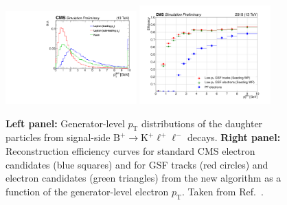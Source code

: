 \documentclass{webofc}
\newcommand{\ellell}{\ensuremath{\ell^+\ell^-}\xspace}
\newcommand{\btok}{\ensuremath{\textrm{B}^+{\rightarrow}\textrm{K}^+}\xspace}
\newcommand{\btokll}{\ensuremath{\btok\ellell}\xspace}
\newcommand{\pt}{\ensuremath{p_\textrm{T}}\xspace}
\begin{document}
\begin{figure}[!t]
  \centering
  \includegraphics[width=0.45\textwidth]{CMS-DP-2019-XXX_S12}
  \includegraphics[width=0.45\textwidth]{CMS-DP-2019-XXX_S14}
  \caption{\textbf{Left panel:} Generator-level \pt distributions of
    the daughter particles from signal-side \btokll decays.
    \textbf{Right panel:} Reconstruction efficiency curves for standard 
    CMS electron candidates (blue squares) and for GSF tracks (red
    circles) and electron candidates (green triangles) from the new
    algorithm  as a function of the generator-level electron \pt.
    Taken from Ref.~\cite{bpark-dps}.} 
  \label{fig:3}
\end{figure}
\end{document}
